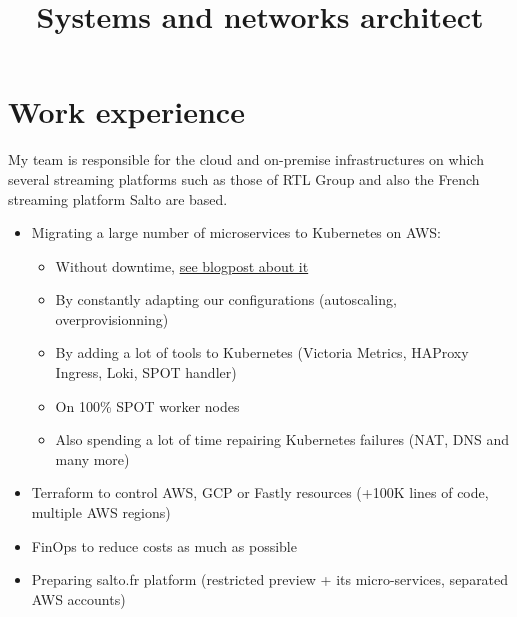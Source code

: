 \documentclass[12pt,a4paper,roman]{moderncv}          %
\title{Systems and networks architect}
\begin{document}
\makecvtitle


\section{Work experience}

{My team is responsible for the cloud and on-premise infrastructures on which several streaming platforms such as those of RTL Group and also the French streaming platform Salto are based.
\begin{itemize}
  \item Migrating a large number of microservices to Kubernetes on AWS:
  \begin{itemize}
    \item Without downtime, \href{https://tech.bedrockstreaming.com/Migrating-production-apps-from-on-premise-to-the-cloud-with-no-downtime/}{\color{blue}see blogpost about it}
    \item By constantly adapting our configurations (autoscaling, overprovisionning)
    \item By adding a lot of tools to Kubernetes (Victoria Metrics, HAProxy Ingress, Loki, SPOT handler)
    \item On 100\% SPOT worker nodes
    \item Also spending a lot of time repairing Kubernetes failures (NAT, DNS and many more)
  \end{itemize}
  \item Terraform to control AWS, GCP or Fastly resources (+100K lines of code, multiple AWS regions)
  \item FinOps to reduce costs as much as possible
  \item Preparing salto.fr platform (restricted preview + its micro-services, separated AWS accounts)
\end{itemize}}
\end{document}
